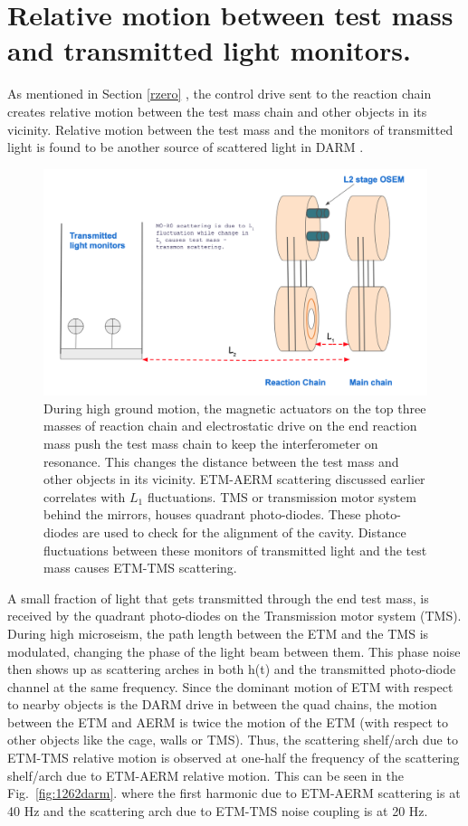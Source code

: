 \documentclass[12pt]{iopart}
\begin{document}
\section{Relative motion between test mass and transmitted light monitors.} \label{transmon_scattering}
As mentioned in Section \ref{rzero} , the control drive sent to the reaction chain creates relative motion between the test mass chain and other objects in its vicinity. Relative motion between the test mass and the monitors of transmitted light is found to be another source of scattered light in DARM \cite{alogae_tmsx,alogsid_tmsx}.
\par
\begin{figure}[h]
    \centering
    \includegraphics[width=12cm]{mirror-diag2.png}
    \caption{During high ground motion, the magnetic actuators on the top three masses of reaction chain and electrostatic drive on the end reaction mass push the test mass chain to keep the interferometer on resonance. This changes the distance between the test mass and other objects in its vicinity. ETM-AERM scattering discussed earlier correlates with $L_{1}$ fluctuations. TMS or transmission motor system behind the mirrors, houses quadrant photo-diodes. These photo-diodes are used to check for the alignment of the cavity. Distance fluctuations between these monitors of  transmitted light and the test mass causes ETM-TMS scattering.}
    \label{fig:my_label}
\end{figure}

A small fraction of light that gets transmitted through the end test mass, is received by the quadrant photo-diodes on the Transmission motor system (TMS). During high microseism, the path length between the ETM and the TMS is modulated, changing the phase of the light beam between them. This phase noise then shows up as scattering arches in both h(t) and the transmitted photo-diode channel at the same frequency. 
Since the dominant motion of ETM with respect to nearby objects is the DARM drive in between the quad chains, the motion between the ETM and AERM is twice the motion of the ETM (with respect to other objects like the cage, walls or TMS). Thus, the scattering shelf/arch due to ETM-TMS relative motion is observed at one-half the frequency of the scattering shelf/arch due to ETM-AERM relative motion. This can be seen in the Fig.~\ref{fig:1262darm}. where the first harmonic due to ETM-AERM scattering is at 40 Hz and the scattering arch due to ETM-TMS noise coupling is at 20 Hz.
\end{document}
